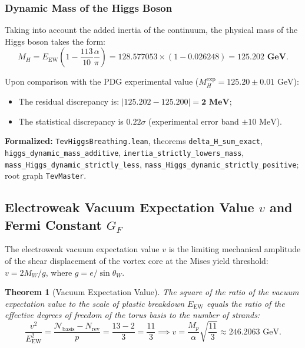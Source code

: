 \documentclass[11pt,a4paper]{article}
\newtheorem{theorem}{Theorem}
\theoremstyle{definition}
\theoremstyle{remark}
\begin{document}
\subsubsection{Dynamic Mass of the Higgs Boson}

Taking into account the added inertia of the continuum, the physical mass of the Higgs boson takes the form:
\begin{equation}
M_H = E_{\mathrm{EW}} \left(1 - \frac{113}{10} \frac{\alpha}{\pi}\right) = 128.577053 \times \left(1 - 0.026248\right) = \mathbf{125.202 \text{ GeV}}.
\end{equation}

Upon comparison with the PDG experimental value ($M_H^{\mathrm{exp}} = 125.20 \pm 0.01\text{ GeV}$):
\begin{itemize}
    \item The residual discrepancy is: $|125.202 - 125.200| = \mathbf{2\text{ MeV}}$;
    \item The statistical discrepancy is $0.22\sigma$ (experimental error band $\pm 10\text{ MeV}$).
\end{itemize}

\noindent\small\textbf{Formalized:} \texttt{TevHiggsBreathing.lean}, theorems \texttt{delta\_H\_sum\_exact}, \texttt{higgs\_dynamic\_mass\_additive}, \texttt{inertia\_strictly\_lowers\_mass}, \texttt{mass\_Higgs\_dynamic\_strictly\_less}, \texttt{mass\_Higgs\_dynamic\_strictly\_positive}; root graph \texttt{TevMaster}.

\subsection{Electroweak Vacuum Expectation Value $v$ and Fermi Constant $G_F$}
	
The electroweak vacuum expectation value $v$ is the limiting mechanical amplitude of the shear displacement of the vortex core at the Mises yield threshold: $v = 2 M_W / g$, where $g = e / \sin\theta_W$.
	
\begin{theorem}[Vacuum Expectation Value]
\label{thm:vev_exact_ratio}
The square of the ratio of the vacuum expectation value to the scale of plastic breakdown $E_{\mathrm{EW}}$ equals the ratio of the effective degrees of freedom of the torus basis to the number of strands:
\begin{equation}
	\frac{v^2}{E_{\mathrm{EW}}^2} = \frac{\mathcal{N}_{\mathrm{basis}} - N_{\mathrm{rev}}}{p} = \frac{13 - 2}{3} = \frac{11}{3} \implies v = \frac{M_p}{\alpha} \sqrt{\frac{11}{3}} \approx 246.2063\text{ GeV}.
\label{eq:vev_ratio_exact}
\end{equation}
\end{theorem}
\end{document}
